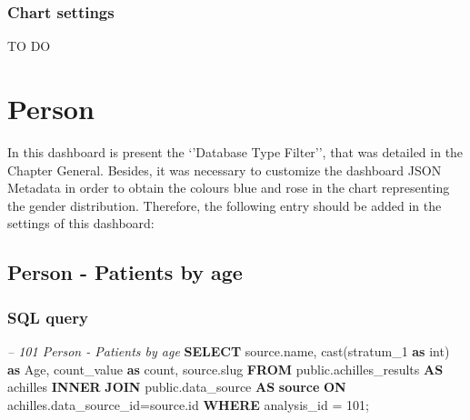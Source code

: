 \documentclass[]{book}
\newenvironment{Shaded}{\begin{snugshade}}{\end{snugshade}}
\newcommand{\KeywordTok}[1]{\textcolor[rgb]{0.13,0.29,0.53}{\textbf{#1}}}
\newcommand{\DataTypeTok}[1]{\textcolor[rgb]{0.13,0.29,0.53}{#1}}
\newcommand{\DecValTok}[1]{\textcolor[rgb]{0.00,0.00,0.81}{#1}}
\newcommand{\StringTok}[1]{\textcolor[rgb]{0.31,0.60,0.02}{#1}}
\newcommand{\CommentTok}[1]{\textcolor[rgb]{0.56,0.35,0.01}{\textit{#1}}}
\newcommand{\FunctionTok}[1]{\textcolor[rgb]{0.00,0.00,0.00}{#1}}
\newcommand{\ErrorTok}[1]{\textcolor[rgb]{0.64,0.00,0.00}{\textbf{#1}}}
\newcommand{\NormalTok}[1]{#1}
\begin{document}
\subsection{Chart settings}\label{chart-settings-6}

TO DO

\chapter{Person}\label{person}

In this dashboard is present the `'Database Type Filter'', that was
detailed in the Chapter General. Besides, it was necessary to customize
the dashboard JSON Metadata in order to obtain the colours blue and rose
in the chart representing the gender distribution. Therefore, the
following entry should be added in the settings of this dashboard:

\begin{Shaded}
\end{Shaded}

\section{Person - Patients by age}\label{person---patients-by-age}

\subsection{SQL query}\label{sql-query-7}

\begin{Shaded}
\begin{Highlighting}[]
\CommentTok{-- 101  Person - Patients by age}
\KeywordTok{SELECT}\NormalTok{ source.name,}
       \FunctionTok{cast}\NormalTok{(stratum_1 }\KeywordTok{as} \DataTypeTok{int}\NormalTok{) }\KeywordTok{as}\NormalTok{ Age,}
\NormalTok{       count_value }\KeywordTok{as} \FunctionTok{count}\NormalTok{, }
\NormalTok{       source.slug}
\KeywordTok{FROM}\NormalTok{ public.achilles_results }\KeywordTok{AS}\NormalTok{ achilles }\KeywordTok{INNER} \KeywordTok{JOIN} 
\NormalTok{    public.data_source }\KeywordTok{AS} \KeywordTok{source} \KeywordTok{ON} 
\NormalTok{    achilles.data_source_id=source.id}
\KeywordTok{WHERE}\NormalTok{ analysis_id = }\DecValTok{101}\NormalTok{;}
\end{Highlighting}
\end{Shaded}
\end{document}
